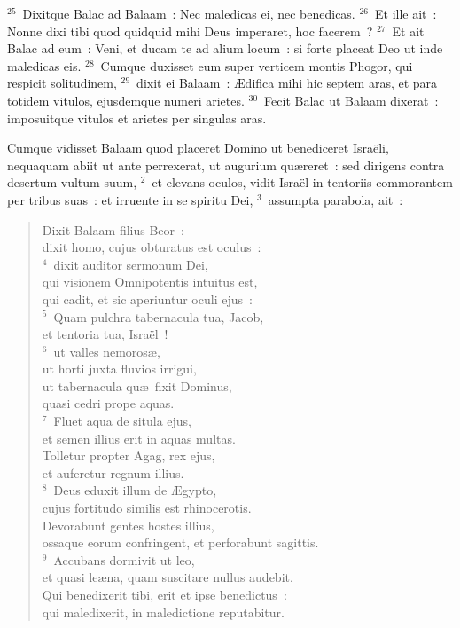 ${}^{25}$~Dixitque Balac ad Balaam~: Nec maledicas ei, nec benedicas.
${}^{26}$~Et ille ait~: Nonne dixi tibi quod quidquid mihi Deus imperaret, hoc facerem~?
${}^{27}$~Et ait Balac ad eum~: Veni, et ducam te ad alium locum~: si forte placeat Deo ut inde maledicas eis.
${}^{28}$~Cumque duxisset eum super verticem montis Phogor, qui respicit solitudinem,
${}^{29}$~dixit ei Balaam~: \AE difica mihi hic septem aras, et para totidem vitulos, ejusdemque numeri arietes.
${}^{30}$~Fecit Balac ut Balaam dixerat~: imposuitque vitulos et arietes per singulas aras.

\lettrine[lines=3,image=true,loversize=0.05,lraise=-0.03]{C}{}umque vidisset Balaam quod placeret Domino ut benediceret Isra\"eli, nequaquam abiit ut ante perrexerat, ut augurium qu\ae reret~: sed dirigens contra desertum vultum suum,
${}^{2}$~et elevans oculos, vidit Isra\"el in tentoriis commorantem per tribus suas~: et irruente in se spiritu Dei,
${}^{3}$~assumpta parabola, ait~: \begin{flushleft}\begin{verse}Dixit Balaam filius Beor~:\\ dixit homo, cujus obturatus est oculus~:\\
${}^{4}$~dixit auditor sermonum Dei,\\ qui visionem Omnipotentis intuitus est,\\ qui cadit, et sic aperiuntur oculi ejus~:\\
${}^{5}$~Quam pulchra tabernacula tua, Jacob,\\ et tentoria tua, Isra\"el~!\\
${}^{6}$~ut valles nemoros\ae ,\\ ut horti juxta fluvios irrigui,\\ ut tabernacula qu\ae\ fixit Dominus,\\ quasi cedri prope aquas.\\
${}^{7}$~Fluet aqua de situla ejus,\\ et semen illius erit in aquas multas.\\ Tolletur propter Agag, rex ejus,\\ et auferetur regnum illius.\\
${}^{8}$~Deus eduxit illum de \AE gypto,\\ cujus fortitudo similis est rhinocerotis.\\ Devorabunt gentes hostes illius,\\ ossaque eorum confringent, et perforabunt sagittis.\\
${}^{9}$~Accubans dormivit ut leo,\\ et quasi le\ae na, quam suscitare nullus audebit.\\ Qui benedixerit tibi, erit et ipse benedictus~:\\ qui maledixerit, in maledictione reputabitur.\end{verse}\end{flushleft}


